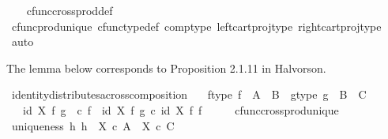 \begin{isabellebody}
%
\isadelimproof
\ \ %
\endisadelimproof
%
\isatagproof
{}\isamarkupfalse%
\ cfunc{\isacharunderscore}{\kern0pt}cross{\isacharunderscore}{\kern0pt}prod{\isacharunderscore}{\kern0pt}def\isanewline
\ \ \isamarkupfalse%
\ cfunc{\isacharunderscore}{\kern0pt}prod{\isacharunderscore}{\kern0pt}unique\ cfunc{\isacharunderscore}{\kern0pt}type{\isacharunderscore}{\kern0pt}def\ comp{\isacharunderscore}{\kern0pt}type\ left{\isacharunderscore}{\kern0pt}cart{\isacharunderscore}{\kern0pt}proj{\isacharunderscore}{\kern0pt}type\ right{\isacharunderscore}{\kern0pt}cart{\isacharunderscore}{\kern0pt}proj{\isacharunderscore}{\kern0pt}type\ \isamarkupfalse%
\ auto%
\endisatagproof
{\isafoldproof}%
%
\isadelimproof
%
\endisadelimproof
%
\begin{isamarkuptext}%
The lemma below corresponds to Proposition 2.1.11 in Halvorson.%
\end{isamarkuptext}\isamarkuptrue%
\isamarkupfalse%
\ identity{\isacharunderscore}{\kern0pt}distributes{\isacharunderscore}{\kern0pt}across{\isacharunderscore}{\kern0pt}composition{\isacharcolon}{\kern0pt}\isanewline
\ \ \ f{\isacharunderscore}{\kern0pt}type{\isacharcolon}{\kern0pt}\ {\isachardoublequoteopen}f\ {\isacharcolon}{\kern0pt}\ A\ {\isasymrightarrow}\ B{\isachardoublequoteclose}\ \ g{\isacharunderscore}{\kern0pt}type{\isacharcolon}{\kern0pt}\ {\isachardoublequoteopen}g\ {\isacharcolon}{\kern0pt}\ B\ {\isasymrightarrow}\ C{\isachardoublequoteclose}\isanewline
\ \ \ {\isachardoublequoteopen}id\ X\ {\isasymtimes}\isactrlsub f\ {\isacharparenleft}{\kern0pt}g\ \ {\isasymcirc}\isactrlsub c\ f{\isacharparenright}{\kern0pt}\ {\isacharequal}{\kern0pt}\ {\isacharparenleft}{\kern0pt}id\ X\ {\isasymtimes}\isactrlsub f\ g{\isacharparenright}{\kern0pt}\ {\isasymcirc}\isactrlsub c\ {\isacharparenleft}{\kern0pt}id\ X\ {\isasymtimes}\isactrlsub f\ f{\isacharparenright}{\kern0pt}{\isachardoublequoteclose}\isanewline
%
\isadelimproof
%
\endisadelimproof
%
\isatagproof
{}\isamarkupfalse%
\ {\isacharminus}{\kern0pt}\isanewline
\ \ \isamarkupfalse%
\ cfunc{\isacharunderscore}{\kern0pt}cross{\isacharunderscore}{\kern0pt}prod{\isacharunderscore}{\kern0pt}unique\isanewline
\ \ \isamarkupfalse%
\ uniqueness{\isacharcolon}{\kern0pt}\ {\isachardoublequoteopen}{\isasymforall}h{\isachardot}{\kern0pt}\ h\ {\isacharcolon}{\kern0pt}\ X\ {\isasymtimes}\isactrlsub c\ A\ {\isasymrightarrow}\ X\ {\isasymtimes}\isactrlsub c\ C\ {\isasymand}\isanewline

\end{isabellebody}
